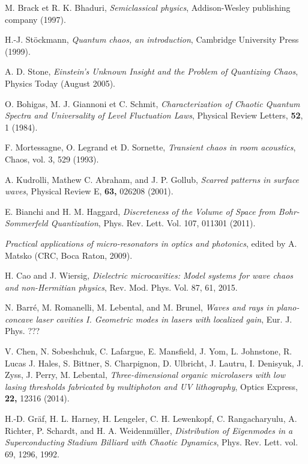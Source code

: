 \documentclass[10pt]{iopart}
\begin{document}
\begin{thebibliography}{10}

M. Brack et R. K. Bhaduri, \emph{Semiclassical physics},
Addison-Wesley publishing company (1997).

H.-J. St\"ockmann, \emph{Quantum chaos, an introduction}, Cambridge
University Press (1999).

A. D. Stone, \emph{Einstein's Unknown Insight and the Problem of
Quantizing Chaos}, Physics Today (August 2005).

O. Bohigas, M. J. Giannoni et C. Schmit, \emph{Characterization of
Chaotic Quantum Spectra and Universality of Level Fluctuation Laws},
Physical Review Letters, {\bf 52}, 1 (1984).

 F. Mortessagne, O. Legrand et D. Sornette, \emph{Transient chaos in room acoustics}, Chaos, vol. 3, 529 (1993).

 A. Kudrolli, Mathew C. Abraham, and J. P. Gollub, \emph{Scarred patterns in surface waves}, Physical Review E, {\bf 63,} 026208 (2001).

 E. Bianchi and H. M. Haggard, \emph{Discreteness of the Volume of Space from Bohr-Sommerfeld Quantization}, Phys. Rev. Lett. Vol. 107, 011301 (2011).

 \emph{Practical applications of micro-resonators
in optics and photonics}, edited by A. Matsko (CRC, Boca Raton, 2009).

 H. Cao and J. Wiersig, \emph{Dielectric microcavities: Model systems for wave chaos and non-Hermitian physics}, Rev. Mod. Phys. Vol. 87, 61, 2015.

 N. Barr\'e, M. Romanelli, M. Lebental, and M. Brunel, \emph{Waves and rays in plano-concave laser cavities I.
Geometric modes in lasers with localized gain}, Eur. J. Phys. ???

 V. Chen, N. Sobeshchuk, C. Lafargue, E. Mansfield, J. Yom, L. Johnstone, R. Lucas  J. Hales,  S. Bittner,  S. Charpignon,  D. Ulbricht, J. Lautru, I. Denisyuk, J. Zyss, J. Perry, M. Lebental, \emph{Three-dimensional organic microlasers with low lasing thresholds fabricated by multiphoton and UV lithography}, Optics Express, {\bf 22,} 12316 (2014).

 H.-D. Gr{\"a}f, H. L. Harney, H. Lengeler, C. H. Lewenkopf, C. Rangacharyulu, A. Richter, P. Schardt, and H. A. Weidenm{\"u}ller, \emph{Distribution of Eigenmodes in a Superconducting Stadium Billiard with Chaotic Dynamics}, Phys. Rev. Lett. vol. 69, 1296, 1992.


\end{thebibliography}
\end{document}
